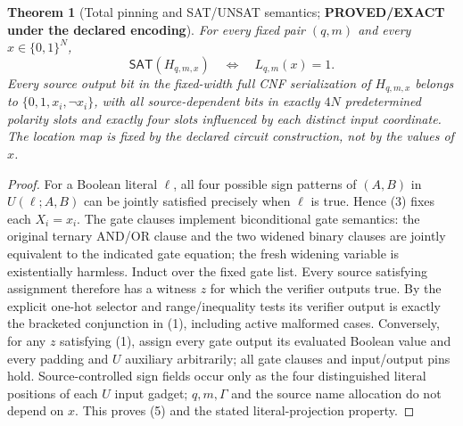 \documentclass[11pt]{article}
\newtheorem{theorem}{Theorem}
\newcommand{\SAT}{\mathsf{SAT}}
\begin{document}
\begin{theorem}[Total pinning and SAT/UNSAT semantics; \textbf{PROVED/EXACT under the declared encoding}]
For every fixed pair $(q,m)$ and every $x\in\{0,1\}^{N}$,
\[
 \SAT(H_{q,m,x})\quad\Longleftrightarrow\quad L_{q,m}(x)=1.\tag{5}
\]
Every source output bit in the fixed-width full CNF serialization of $H_{q,m,x}$ belongs to $\{0,1,x_i,\neg x_i\}$, with all source-dependent bits in exactly $4N$ predetermined polarity slots and exactly four slots influenced by each distinct input coordinate. The location map is fixed by the declared circuit construction, not by the values of $x$.
\end{theorem}
\begin{proof}
For a Boolean literal $\ell$, all four possible sign patterns of $(A,B)$ in $U(\ell;A,B)$ can be jointly satisfied precisely when $\ell$ is true. Hence (3) fixes each $X_i=x_i$. The gate clauses implement biconditional gate semantics: the original ternary AND/OR clause and the two widened binary clauses are jointly equivalent to the indicated gate equation; the fresh widening variable is existentially harmless. Induct over the fixed gate list. Every source satisfying assignment therefore has a witness $z$ for which the verifier outputs true. By the explicit one-hot selector and range/inequality tests its verifier output is exactly the bracketed conjunction in (1), including active malformed cases. Conversely, for any $z$ satisfying (1), assign every gate output its evaluated Boolean value and every padding and $U$ auxiliary arbitrarily; all gate clauses and input/output pins hold. Source-controlled sign fields occur only as the four distinguished literal positions of each $U$ input gadget; $q,m,\Gamma$ and the source name allocation do not depend on $x$. This proves (5) and the stated literal-projection property.
\end{proof}
\end{document}
